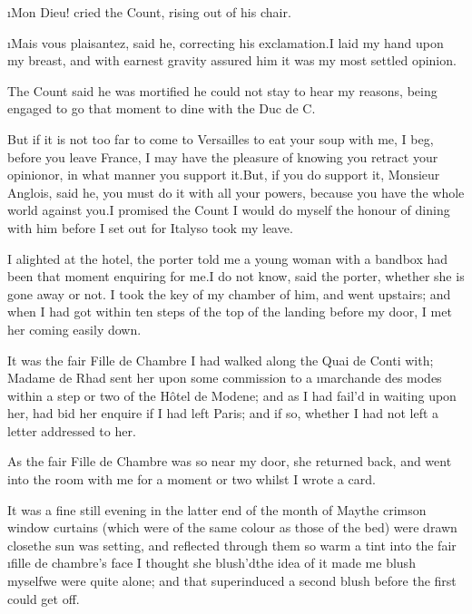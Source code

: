 \documentclass[twoside]{article}
\begin{document}
\i{Mon Dieu}! cried the Count, rising out
of his chair.

\i{Mais vous plaisantez}, said he,
correcting his exclamation.\tskk I laid my
hand upon my breast, and with earnest
gravity assured him it was my most settled
opinion.

The Count said he was mortified he could
not stay to hear my reasons, being engaged
to go that moment to dine with the Duc de
C\tskk .

But if it is not too far to come to
Versailles to eat your soup with me, I
beg, before you leave France, I may have
the pleasure of knowing you retract your
opinion\tskk or, in what manner you
support it.\tskk But, if you do support
it, Monsieur Anglois, said he, you must do
it with all your powers, because you have
the whole world against you.\tskk I
promised the Count I would do myself the
honour of dining with him before I set out
for Italy\tskk so took my leave.





\vskip 6pt


 I alighted at the hotel,
the porter told me a young woman with a
bandbox had been that moment enquiring for
me.\tskk I do not know, said the porter,
whether she is gone away or not.  I took
the key of my chamber of him, and went
upstairs; and when I had got within ten
steps of the top of the landing before my
door, I met her coming easily down.

It was the fair Fille de Chambre I had
walked along the Quai de Conti with;
Madame de R\tskk  had sent her upon some
commission to a \i{marchande des modes}
within a step or two of the Hôtel de
Modene; and as I had fail’d in waiting
upon her, had bid her enquire if I had
left Paris; and if so, whether I had not
left a letter addressed to her.

As the fair Fille de Chambre was so
near my door, she returned back, and went
into the room with me for a moment or two
whilst I wrote a card.

It was a fine still evening in the latter
end of the month of May\tskk the crimson
window curtains (which were of the same
colour as those of the bed) were drawn
close\tskk the sun was setting, and
reflected through them so warm a tint into
the fair \i{fille de chambre’s} face\tskk
I thought she blush’d\tskk the idea of it
made me blush myself\tskk we were quite
alone; and that superinduced a second
blush before the first could get off.
\end{document}
